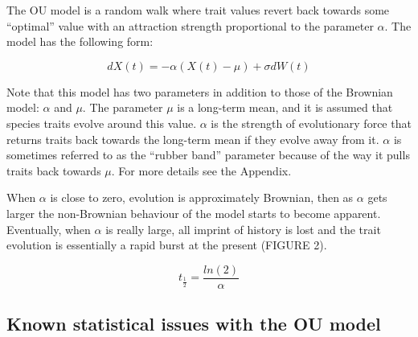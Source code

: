 \documentclass[a4paper,12pt]{article}
\begin{document}
    The OU model \citep{hansen1997stabilizing,Butler:2004aa} is a random walk where trait values revert back towards some ``optimal'' value with an attraction strength proportional to the parameter $\alpha$. 
    The model has the following form:
  
      \begin{equation}
        dX(t) = - \alpha (X(t) - \mu) + \sigma dW(t)
      \end{equation}

    Note that this model has two parameters in addition to those of the Brownian model: $\alpha$ and $\mu$. 
    The parameter $\mu$ is a long-term mean, and it is assumed that species traits evolve around this value. 
    $\alpha$ is the strength of evolutionary force that returns traits back towards the long-term mean if they evolve away from it. 
    $\alpha$ is sometimes referred to as the ``rubber band'' parameter because of the way it pulls traits back towards $\mu$. For more details see the Appendix.
    
    When $\alpha$ is close to zero, evolution is approximately Brownian, then as $\alpha$ gets larger the non-Brownian behaviour of the model starts to become apparent. 
    Eventually, when $\alpha$ is really large, all imprint of history is lost and the trait evolution is essentially a rapid burst at the present (FIGURE 2). %


      \begin{equation}
        t_\frac{1}{2} = \frac{ln(2)}{\alpha}
        \label{equation:halflife}
      \end{equation}

  
  \subsection{Known statistical issues with the OU model}
\end{document}
